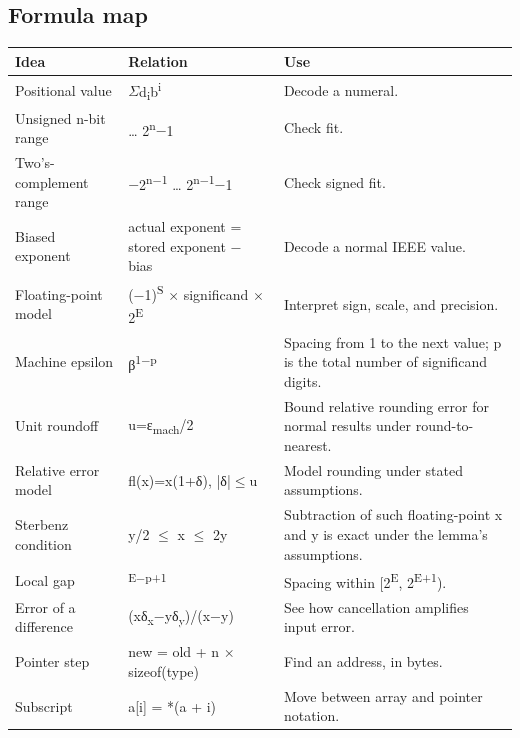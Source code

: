 \documentclass[11pt]{article}
\begin{document}
\begin{keepsection}
\section{Formula map}

\begin{center}\small\begin{tabularx}{\linewidth}{>{\raggedright\arraybackslash}X>{\raggedright\arraybackslash}X>{\raggedright\arraybackslash}X}\toprule
\textbf{Idea} & \textbf{Relation} & \textbf{Use} \\ \midrule
Positional value & \ensuremath{\Sigma}d\textsubscript{i}b\textsuperscript{i} & Decode a numeral. \\
Unsigned n-bit range & 0 … 2\textsuperscript{n}\ensuremath{-}1 & Check fit. \\
Two’s-complement range & \ensuremath{-}2\textsuperscript{n\ensuremath{-}1} … 2\textsuperscript{n\ensuremath{-}1}\ensuremath{-}1 & Check signed fit. \\
Biased exponent & actual exponent = stored exponent \ensuremath{-} bias & Decode a normal IEEE value. \\
Floating-point model & (\ensuremath{-}1)\textsuperscript{S} \ensuremath{\times} significand \ensuremath{\times} 2\textsuperscript{E} & Interpret sign, scale, and precision. \\
Machine epsilon & β\textsuperscript{1\ensuremath{-}p} & Spacing from 1 to the next value; p is the total number of significand digits. \\
Unit roundoff & u=ε\textsubscript{mach}/2 & Bound relative rounding error for normal results under round-to-nearest. \\
Relative error model & fl(x)=x(1+δ), |δ|\ensuremath{\leq}u & Model rounding under stated assumptions. \\
Sterbenz condition & y/2 \ensuremath{\leq} x \ensuremath{\leq} 2y & Subtraction of such floating-point x and y is exact under the lemma's assumptions. \\
Local gap & 2\textsuperscript{E\ensuremath{-}p+1} & Spacing within [2\textsuperscript{E}, 2\textsuperscript{E+1}). \\
Error of a difference & (xδ\textsubscript{x}\ensuremath{-}yδ\textsubscript{y})/(x\ensuremath{-}y) & See how cancellation amplifies input error. \\
Pointer step & new = old + n \ensuremath{\times} sizeof(type) & Find an address, in bytes. \\
Subscript & a[i] = *(a + i) & Move between array and pointer notation. \\
\bottomrule\end{tabularx}\end{center}


\end{keepsection}
\end{document}
